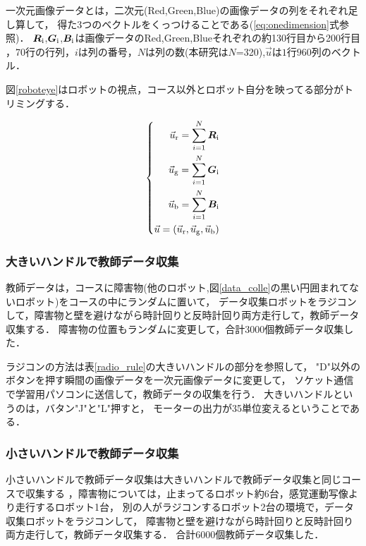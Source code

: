 
一次元画像データとは，二次元(Red,Green,Blue)の画像データの列をそれぞれ足し算して，
得た3つのベクトルをくっつけることである(\ref{eq:onedimension}式参照)．
$\boldsymbol R_{\rm i}$,$\boldsymbol G_{\rm i}$,$\boldsymbol B_{\rm i}$は画像データのRed,Green,Blueそれぞれの約130行目から200行目
，70行の行列，$i$は列の番号，$N$は列の数(本研究は$N$=320),$\vec u$は$1$行$960$列のベクトル．

図\ref{roboteye}はロボットの視点，コース以外とロボット自分を映ってる部分がトリミングする．

\vspace{-2mm}
\begin{eqnarray}
\left\{
\begin{aligned}
\vec u_{\rm r}= \sum_{i=1}^N \boldsymbol R_{\rm i}\\
\vec u_{\rm g}= \sum_{i=1}^N \boldsymbol G_{\rm i}\\
\vec u_{\rm b}= \sum_{i=1}^N \boldsymbol B_{\rm i}\\
\vec u = (\vec u_{\rm r},\vec u_{\rm g},\vec u_{\rm b}) \\
\end{aligned}
\right.
\label{eq:onedimension}
\end{eqnarray}


\subsubsection{大きいハンドルで教師データ収集}
教師データは，コースに障害物(他のロボット,図\ref{data_colle}の黒い円囲まれてないロボット)をコースの中にランダムに置いて，
データ収集ロボットをラジコンして，障害物と壁を避けながら時計回りと反時計回り両方走行して，教師データ収集する．
障害物の位置もランダムに変更して，合計3000個教師データ収集した．

ラジコンの方法は表\ref{radio_rule}の大きいハンドルの部分を参照して，
"D"以外のボタンを押す瞬間の画像データを一次元画像データに変更して，
ソケット通信で学習用パソコンに送信して，教師データの収集を行う．
大きいハンドルというのは，バタン"J"と"L"押すと，
モーターの出力が35単位変えるということである．
\subsubsection{小さいハンドルで教師データ収集}
小さいハンドルで教師データ収集は大きいハンドルで教師データ収集と同じコースで収集する
，障害物については，止まってるロボット約6台，感覚運動写像より走行するロボット1台，
別の人がラジコンするロボット2台の環境で，データ収集ロボットをラジコンして，
障害物と壁を避けながら時計回りと反時計回り両方走行して，教師データ収集する．
合計6000個教師データ収集した．

